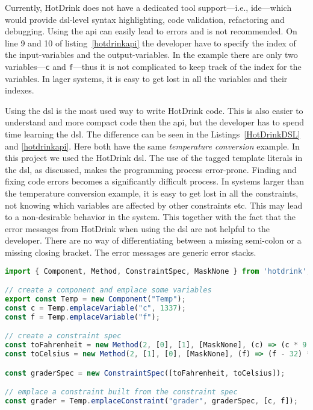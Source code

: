 Currently, HotDrink does not have a dedicated tool support---i.e., \gls{ide}---which would provide \gls{dsl}-level syntax highlighting, code validation, refactoring and debugging. Using the \gls{api} can easily lead to errors and is not recommended. On line 9 and 10 of listing~\ref{hotdrinkapi} the developer have to specify the index of the input-variables and the output-variables. In the example there are only two variables---\texttt{c} and \texttt{f}---thus it is not complicated to keep track of the index for the variables. In lager systems, it is easy to get lost in all the variables and their indexes.

Using the \gls{dsl} is the most used way to write HotDrink code. This is also easier to understand and more compact code then the \gls{api}, but the developer has to spend time learning the \gls{dsl}. The difference can be  seen in the Listings~\ref{HotDrinkDSL} and \ref{hotdrinkapi}. Here both have the same \textit{temperature conversion} example. In this project we used the HotDrink \gls{dsl}. The use of the tagged template literals in the \gls{dsl}, as discussed, makes the programming process error-prone. Finding and fixing code errors becomes a significantly difficult process. In systems larger than the temperature conversion example, it is easy to get lost in all the constraints, not knowing which variables are affected by other constraints etc. This may lead to a non-desirable behavior in the system. This together with the fact that the error messages from HotDrink when using the \gls{dsl} are not helpful to the developer. There are no way of differentiating between a missing semi-colon or a missing closing bracket. The error messages are generic error stacks. 

\begin{lstlisting}[caption={Example of how to use the HotDrink \gls{api} to simulate the relationship between fahrenheit and celsius.},label=hotdrinkapi, language=JavaScript]
import { Component, Method, ConstraintSpec, MaskNone } from 'hotdrink';

// create a component and emplace some variables
export const Temp = new Component("Temp");
const c = Temp.emplaceVariable("c", 1337);
const f = Temp.emplaceVariable("f");

// create a constraint spec
const toFahrenheit = new Method(2, [0], [1], [MaskNone], (c) => (c * 9 / 5 + 32));
const toCelsius = new Method(2, [1], [0], [MaskNone], (f) => (f - 32) * 5 / 9);

const graderSpec = new ConstraintSpec([toFahrenheit, toCelsius]);

// emplace a constraint built from the constraint spec
const grader = Temp.emplaceConstraint("grader", graderSpec, [c, f]);
\end{lstlisting}
